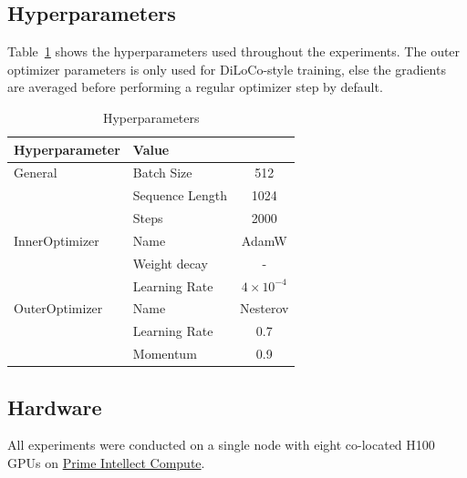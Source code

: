 \documentclass{article}
\begin{document}
\subsection{Hyperparameters}

Table~\ref{tab:hyperparameters} shows the hyperparameters used throughout the
experiments. The outer optimizer parameters is only used for DiLoCo-style
training, else the gradients are averaged before performing a regular optimizer
step by default.

\begin{table}[ht]
\centering
\begin{tabular}{llc}
\toprule
\textbf{Hyperparameter} & \textbf{Value} \\ 
\midrule
\multirow{1}{*}{General} & Batch Size & 512 \\ 
& Sequence Length & 1024 \\ 
& Steps & 2000 \\
\hline
\multirow{1}{*}{InnerOptimizer} & Name & AdamW \\ 
& Weight decay & - \\ 
& Learning Rate & $4 \times 10^{-4}$ \\ 
\hline
\multirow{1}{*}{OuterOptimizer} & Name & Nesterov \\ 
& Learning Rate & 0.7 \\ 
& Momentum & 0.9 \\ 
\bottomrule
\end{tabular}
\caption{Hyperparameters}
\label{tab:hyperparameters}
\end{table}

\subsection{Hardware}

All experiments were conducted on a single node with eight co-located H100 GPUs
on \href{https://app.primeintellect.com/}{Prime Intellect Compute}.
\end{document}
